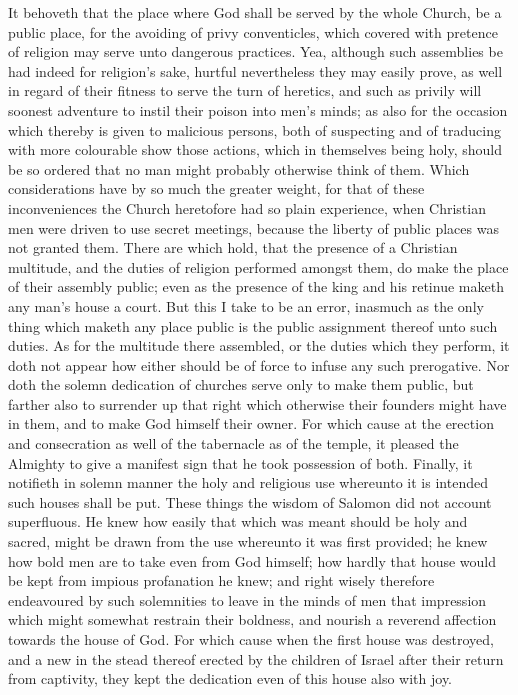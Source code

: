 It behoveth that the place where God shall be served by the whole Church, be a public place, for the avoiding of privy conventicles, which covered with pretence of religion may serve unto dangerous practices. Yea, although such assemblies be had indeed for religion’s sake, hurtful nevertheless they may easily prove, as well in regard of their fitness to serve the turn of heretics, and such as privily will soonest adventure to instil their poison into men’s minds; as also for the occasion which thereby is given to malicious persons, both of suspecting and of traducing with more colourable show those actions, which in themselves being holy, should be so ordered that no man might probably otherwise think of them. Which considerations have by so much the greater weight, for that of these inconveniences the Church heretofore had so plain experience, when Christian men were driven to use secret meetings, because the liberty of public places was not granted them. There are which hold, that the presence of a Christian multitude, and the duties of religion performed amongst them, do make the place of their assembly public; even as the presence of the king and his retinue maketh any man’s house a court. But this I take to be an error, inasmuch as the only thing which maketh any place public is the public assignment thereof unto such duties. As for the multitude there assembled, or the duties which they perform, it doth not appear how either should be of force to infuse any such prerogative.
Nor doth the solemn dedication of churches serve only to make them public, but farther also to surrender up that right which otherwise their founders might have in them, and to make God himself their owner. For which cause at the erection and consecration as well of the tabernacle as of the temple, it pleased the Almighty to give a manifest sign that he took possession of both. Finally, it notifieth in solemn manner the holy and religious use whereunto it is intended such houses shall be put.
These things the wisdom of Salomon did not account superfluous. He knew how easily that which was meant should be holy and sacred, might be drawn from the use whereunto it was first provided; he knew how bold men are to take even from God himself; how hardly that house would be kept from impious profanation he knew; and right wisely therefore endeavoured by such solemnities to leave in the minds of men that impression which might somewhat restrain their boldness, and nourish a reverend affection towards the house of God. For which cause when the first house was destroyed, and a new in the stead thereof erected by the children of Israel after their return from captivity, they kept the dedication even of this house also with joy.
